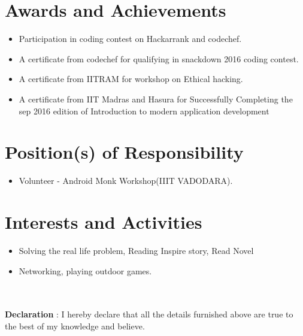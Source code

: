\documentclass{article}
\begin{document}

\section{Awards and Achievements}
\begin{itemize}
\item Participation in coding contest on Hackarrank and codechef.
\item A certificate from codechef for qualifying in snackdown 2016 coding contest.
\item A certificate from IITRAM for workshop on Ethical hacking.
\item A certificate from IIT Madras and Hasura for Successfully Completing the sep 2016 edition of Introduction to modern application development 
 
\end{itemize}


\section{Position(s) of Responsibility}

\begin{itemize}
\item Volunteer - Android Monk  Workshop(IIIT VADODARA). 
\end{itemize}



\section{Interests and Activities}
\begin{itemize}
\item Solving the real life problem, Reading Inspire story, Read Novel
\item Networking, playing outdoor games.\end{itemize}\\\\

\textbf{Declaration} : I hereby declare that all the details furnished above are true to the best of my knowledge and believe.
\end{document}
